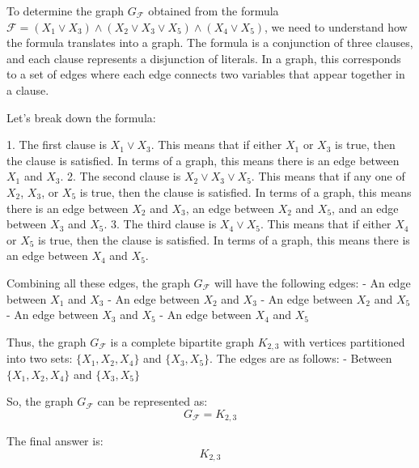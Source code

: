 To determine the graph \( G_{\mathcal{F}} \) obtained from the formula \(\mathcal{F} = (X_1 \vee X_3) \wedge (X_2 \vee X_3 \vee X_5) \wedge (X_4 \vee X_5)\), we need to understand how the formula translates into a graph. The formula is a conjunction of three clauses, and each clause represents a disjunction of literals. In a graph, this corresponds to a set of edges where each edge connects two variables that appear together in a clause.

Let's break down the formula:

1. The first clause is \(X_1 \vee X_3\). This means that if either \(X_1\) or \(X_3\) is true, then the clause is satisfied. In terms of a graph, this means there is an edge between \(X_1\) and \(X_3\).
2. The second clause is \(X_2 \vee X_3 \vee X_5\). This means that if any one of \(X_2\), \(X_3\), or \(X_5\) is true, then the clause is satisfied. In terms of a graph, this means there is an edge between \(X_2\) and \(X_3\), an edge between \(X_2\) and \(X_5\), and an edge between \(X_3\) and \(X_5\).
3. The third clause is \(X_4 \vee X_5\). This means that if either \(X_4\) or \(X_5\) is true, then the clause is satisfied. In terms of a graph, this means there is an edge between \(X_4\) and \(X_5\).

Combining all these edges, the graph \(G_{\mathcal{F}}\) will have the following edges:
- An edge between \(X_1\) and \(X_3\)
- An edge between \(X_2\) and \(X_3\)
- An edge between \(X_2\) and \(X_5\)
- An edge between \(X_3\) and \(X_5\)
- An edge between \(X_4\) and \(X_5\)

Thus, the graph \(G_{\mathcal{F}}\) is a complete bipartite graph \(K_{2,3}\) with vertices partitioned into two sets: \(\{X_1, X_2, X_4\}\) and \(\{X_3, X_5\}\). The edges are as follows:
- Between \(\{X_1, X_2, X_4\}\) and \(\{X_3, X_5\}\)

So, the graph \(G_{\mathcal{F}}\) can be represented as:
\[ G_{\mathcal{F}} = K_{2,3} \]

The final answer is:
\[
\boxed{K_{2,3}}
\]